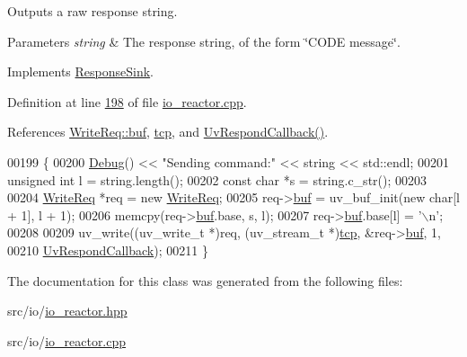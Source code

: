 Outputs a raw response string. 


\begin{DoxyParams}{Parameters}
{\em string} & The response string, of the form \char`\"{}\+C\+O\+D\+E message\char`\"{}. \\
\hline
\end{DoxyParams}


Implements \hyperlink{classResponseSink_a128a514e39f23f2bcc97fea62e9de3c5}{Response\+Sink}.



Definition at line \hyperlink{io__reactor_8cpp_source_l00198}{198} of file \hyperlink{io__reactor_8cpp_source}{io\+\_\+reactor.\+cpp}.



References \hyperlink{io__reactor_8cpp_source_l00054}{Write\+Req\+::buf}, \hyperlink{io__reactor_8hpp_source_l00161}{tcp}, and \hyperlink{io__reactor_8cpp_source_l00092}{Uv\+Respond\+Callback()}.


\begin{DoxyCode}
00199 \{
00200     \hyperlink{classDebug}{Debug}() << \textcolor{stringliteral}{"Sending command:"} << \textcolor{keywordtype}{string} << std::endl;
00201     \textcolor{keywordtype}{unsigned} \textcolor{keywordtype}{int} l = \textcolor{keywordtype}{string}.length();
00202     \textcolor{keyword}{const} \textcolor{keywordtype}{char} *s = \textcolor{keywordtype}{string}.c\_str();
00203 
00204     \hyperlink{structWriteReq}{WriteReq} *req = \textcolor{keyword}{new} \hyperlink{structWriteReq}{WriteReq};
00205     req->\hyperlink{structWriteReq_a2e611e010ab154c56c8055dee140b6b5}{buf} = uv\_buf\_init(\textcolor{keyword}{new} \textcolor{keywordtype}{char}[l + 1], l + 1);
00206     memcpy(req->\hyperlink{structWriteReq_a2e611e010ab154c56c8055dee140b6b5}{buf}.base, s, l);
00207     req->\hyperlink{structWriteReq_a2e611e010ab154c56c8055dee140b6b5}{buf}.base[l] = \textcolor{charliteral}{'\(\backslash\)n'};
00208 
00209     uv\_write((uv\_write\_t *)req, (uv\_stream\_t *)\hyperlink{classTcpResponseSink_afa43e15736053cef76fbf27bdc3197a9}{tcp}, &req->\hyperlink{structWriteReq_a2e611e010ab154c56c8055dee140b6b5}{buf}, 1,
00210              \hyperlink{io__reactor_8cpp_af58ed397c8d93bffdc01b621d4abaa8c}{UvRespondCallback});
00211 \}
\end{DoxyCode}


The documentation for this class was generated from the following files\+:\begin{DoxyCompactItemize}
\item 
src/io/\hyperlink{io__reactor_8hpp}{io\+\_\+reactor.\+hpp}\item 
src/io/\hyperlink{io__reactor_8cpp}{io\+\_\+reactor.\+cpp}\end{DoxyCompactItemize}
